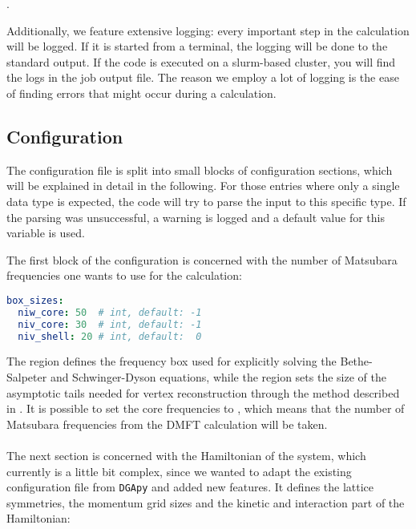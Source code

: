 \documentclass[\main/main.tex]{subfiles}
\begin{document}
\mbox{}.

Additionally, we feature extensive logging: every important step in the calculation will be logged. If it is started from a terminal, the logging will be done to the standard output. If the code is executed on a slurm-based cluster, you will find the logs in the job output file. The reason we employ a lot of logging is the ease of finding errors that might occur during a calculation.

\subsection{Configuration}

The configuration file is split into small blocks of configuration sections, which will be explained in detail in the following. For those entries where only a single data type is expected, the code will try to parse the input to this specific type. If the parsing was unsuccessful, a warning is logged and a default value for this variable is used. 

The first block of the configuration is concerned with the number of Matsubara frequencies one wants to use for the calculation:

\begin{minipage}{\textwidth}%
\begin{lstlisting}[language=yaml]
box_sizes:
  niw_core: 50  # int, default: -1
  niv_core: 30  # int, default: -1
  niv_shell: 20 # int, default:  0
\end{lstlisting}
\end{minipage}
The  region defines the frequency box used for explicitly solving the Bethe-Salpeter and Schwinger-Dyson equations, while the  region sets the size of the asymptotic tails needed for vertex reconstruction through the method described in . It is possible to set the core frequencies to , which means that the number of Matsubara frequencies from the DMFT calculation will be taken.
\\\\
The next section is concerned with the Hamiltonian of the system, which currently is a little bit complex, since we wanted to adapt the existing configuration file from \texttt{DGApy} and added new features. It defines the lattice symmetries, the momentum grid sizes and the kinetic and interaction part of the Hamiltonian:
\end{document}
